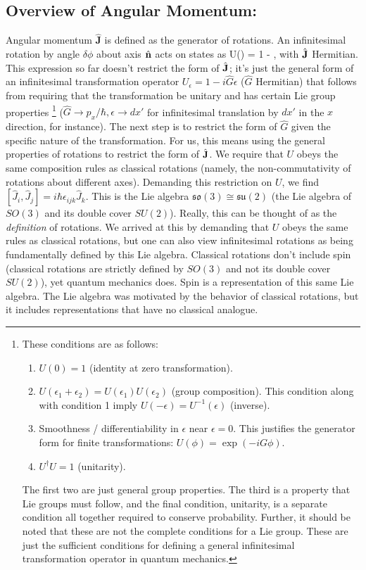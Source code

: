 \subsection{Overview of Angular Momentum:}
Angular momentum $\hat{\mathbf{J}}$ is defined as the generator of rotations. An infinitesimal rotation by angle $\delta\phi$ about axis $\hat{\mathbf{n}}$ acts on states as
\bea
    U(\delta\phi) = 1 - \delta\phi{}\cdot{},
\eea
with $\hat{\mathbf{J}}$ Hermitian. This expression so far doesn't restrict the form of $\hat{\mathbf{J}}$; it's just the general form of an infinitesimal transformation operator $U_\epsilon=1-i\hat{G}\epsilon$ ($\hat{G}$ Hermitian) that follows from requiring that the transformation be unitary and has certain Lie group properties \footnote{
These conditions are as follows: 
\begin{enumerate}
    \item $U(0)=1$ (identity at zero transformation).
    \item $U(\epsilon_1+\epsilon_2)=U(\epsilon_1)U(\epsilon_2)$ (group composition). This condition along with condition 1 imply $U(-\epsilon)=U^{-1}(\epsilon)$ (inverse).
    \item Smoothness / differentiability in $\epsilon$ near $\epsilon=0$. This justifies the generator form for finite transformations: $U(\phi)=\exp(-iG\phi)$.
    \item $U^\dagger U=1$ (unitarity).
\end{enumerate}
The first two are just general group properties. The third is a property that Lie groups must follow, and the final condition, unitarity, is a separate condition all together required to conserve probability. Further, it should be noted that these are not the complete conditions for a Lie group. These are just the sufficient conditions for defining a general infinitesimal transformation operator in quantum mechanics. 
} ($\hat{G}\rightarrow p_x/\hbar, \epsilon\rightarrow dx'$ for infinitesimal translation by $dx'$ in the $x$ direction, for instance). The next step is to restrict the form of $\hat{G}$ given the specific nature of the transformation. For us, this means using the general properties of rotations to restrict the form of $\hat{\mathbf{J}}$. We require that $U$ obeys the same composition rules as classical rotations (namely, the non-commutativity of rotations about different axes). Demanding this restriction on $U$, we find $[\hat{J}_i, \hat{J}_j]=i\hbar \epsilon_{ijk}\hat{J}_k$. This is the Lie algebra $\mathfrak{so}(3)\cong \mathfrak{su}(2)$ (the Lie algebra of $SO(3)$ and its double cover $SU(2)$). Really, this can be thought of as the \textit{definition} of rotations. We arrived at this by demanding that $U$ obeys the same rules as classical rotations, but one can also view infinitesimal rotations as being fundamentally defined by this Lie algebra. Classical rotations don't include spin (classical rotations are strictly defined by $SO(3)$ and not its double cover $SU(2)$), yet quantum mechanics does. Spin is a representation of this same Lie algebra. The Lie algebra was motivated by the behavior of classical rotations, but it includes representations that have no classical analogue.\\

